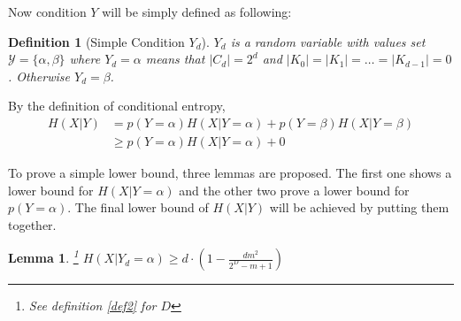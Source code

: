 \documentclass[10pt,a4paper]{article}
\newtheorem{mydef}{Definition}
\newtheorem{mylemma}{Lemma}
\begin{document}
		Now condition $Y$ will be simply defined as following:
		\begin{mydef}[Simple Condition $Y_d$]
			$Y_d$ is a random variable with values set
			$\mathcal Y = \{ \alpha, \beta \}$ where
			$Y_d = \alpha$ means that $|C_d| = 2^d$
			and $|K_0| = |K_1| = \ldots = |K_{d-1}| = 0$.
			Otherwise $Y_d = \beta$.
		\end{mydef}
		
		By the definition of conditional entropy,
		\begin{align*}
			H(X|Y) &= p(Y = \alpha) H(X | Y = \alpha) + p(Y = \beta) H(X | Y = \beta)\\
				&\geq p(Y = \alpha) H(X | Y = \alpha) + 0
		\end{align*}
		
		To prove a simple lower bound, three lemmas are proposed.
		The first one shows a lower bound for $H(X | Y = \alpha)$
		and the other two prove a lower bound for $p(Y = \alpha)$.
		The final lower bound of $H(X | Y)$ will be achieved by putting
		them together.
		
		\begin{mylemma}\label{lem1}\footnote{See definition \ref{def2} for $D$}
			$H(X|Y_d = \alpha) \geq d \cdot (1-\frac{dm^2}{2^D-m+1})$
		\end{mylemma}
		
\end{document}
